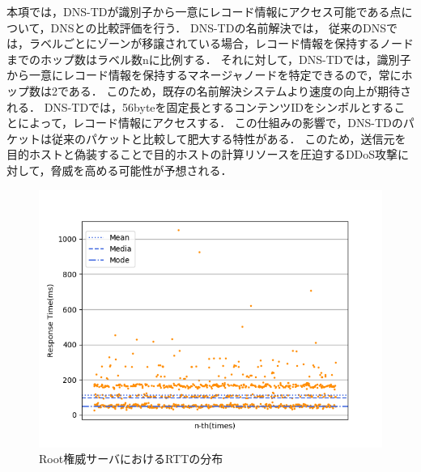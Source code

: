本項では，DNS-TDが識別子から一意にレコード情報にアクセス可能である点について，DNSとの比較評価を行う．
DNS-TDの名前解決では，
従来のDNSでは，ラベルごとにゾーンが移譲されている場合，レコード情報を保持するノードまでのホップ数はラベル数nに比例する．
それに対して，DNS-TDでは，識別子から一意にレコード情報を保持するマネージャノードを特定できるので，常にホップ数は2である．
このため，既存の名前解決システムより速度の向上が期待される．
DNS-TDでは，56byteを固定長とするコンテンツIDをシンボルとすることによって，レコード情報にアクセスする．
この仕組みの影響で，DNS-TDのパケットは従来のパケットと比較して肥大する特性がある．
このため，送信元を目的ホストと偽装することで目的ホストの計算リソースを圧迫するDDoS攻撃に対して，脅威を高める可能性が予想される．

\begin{figure}[h]
 \centering
 \includegraphics[scale=0.8]{figure/root-rtt.png}
 \caption{Root権威サーバにおけるRTTの分布}
 \label{fig:root-rtt}
\end{figure}

